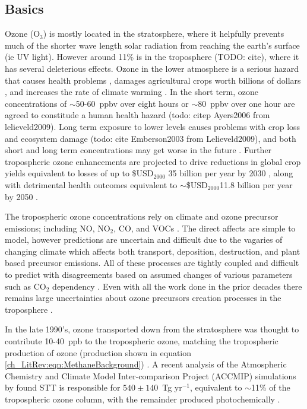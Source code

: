   \subsection{Basics}
    Ozone (O$_3$) is mostly located in the stratosphere, where it helpfully prevents much of the shorter wave length solar radiation from reaching the earth's surface (ie UV light).
    However around 11\% is in the troposphere (TODO: cite), where it has several deleterious effects.
    Ozone in the lower atmosphere is a serious hazard that causes health problems \citep{Hsieh2013}, damages agricultural crops worth billions of dollars \citep{Avnery2011}, and increases the rate of climate warming \citep{IPCC_2013_chap8}.
    In the short term, ozone concentrations of $\sim$50-60~ppbv over eight hours or $\sim$80~ppbv over one hour are agreed to constitude a human health hazard (todo: citep Ayers2006 from lelieveld2009). 
    Long term exposure to lower levels causes problems with crop loss and ecosystem damage (todo: cite Emberson2003 from Lelieveld2009), and both short and long term concentrations may get worse in the future \citep{Lelieveld2009, Stevenson2013}.
    Further tropospheric ozone enhancements are projected to drive reductions in global crop yields equivalent to losses of up to \$USD$_{2000}$ 35 billion per year by 2030 \citep{Avnery2011}, along with detrimental health outcomes equivalent to $\sim$\$USD$_{2000}$11.8 billion per year by 2050 \citep{Selin2009}.
    
    The tropospheric ozone concentrations rely on climate and ozone precursor emissions; including NO, NO$_2$, CO, and VOCs \citep{Atkinson2000, Young2013}. 
    The direct affects are simple to model, however predictions are uncertain and difficult due to the vagaries of changing climate which affects both transport, deposition, destruction, and plant based precursor emissions.
    All of these processes are tightly coupled and difficult to predict with disagreements based on assumed changes of various parameters such as CO$_2$ dependency \citep{Young2013}.
    Even with all the work done in the prior decades there remains large uncertainties about ozone precursors creation processes in the troposphere \citep{Mazzuca2016}.
    
    In the late 1990's, ozone transported down from the stratosphere was thought to contribute 10-40~ppb to the tropospheric ozone,  matching the tropospheric production of ozone (production shown in equation \ref{ch_LitRev:eqn:MethaneBackground}) \citep{Atkinson2000,Stohl2003}.
    A recent analysis of the Atmospheric Chemistry and Climate Model Inter-comparison Project (ACCMIP) simulations by \citet{Young2013} found STT is responsible for $540\pm140$~Tg yr$^{-1}$, equivalent to $\sim$11\% of the tropospheric ozone column, with the remainder produced photochemically \citep{Monks2015}.
    

